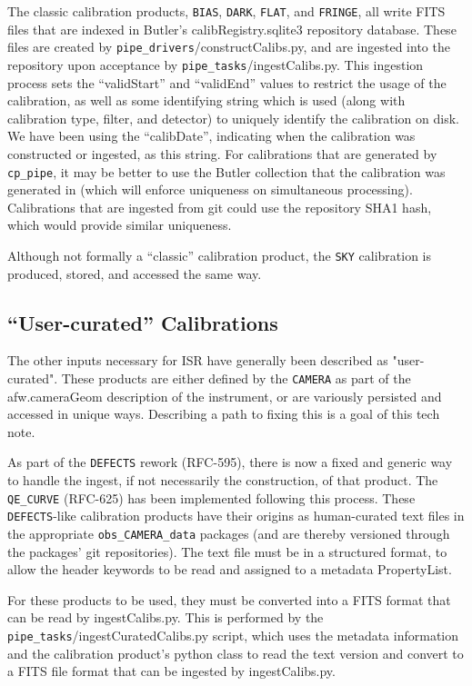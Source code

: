 \documentclass[DM,authoryear,toc]{lsstdoc}
\begin{document}
The classic calibration products, \verb|BIAS|, \verb|DARK|,
\verb|FLAT|, and \verb|FRINGE|, all write FITS files that are indexed
in Butler's calibRegistry.sqlite3 repository database.  These files
are created by \verb|pipe_drivers|/constructCalibs.py, and are
ingested into the repository upon acceptance by
\verb|pipe_tasks|/ingestCalibs.py.  This ingestion process sets the
``validStart'' and ``validEnd'' values to restrict the usage of the
calibration, as well as some identifying string which is used (along
with calibration type, filter, and detector) to uniquely identify the
calibration on disk.  We have been using the ``calibDate'', indicating
when the calibration was constructed or ingested, as this string.  For
calibrations that are generated by \verb|cp_pipe|, it may be better to
use the Butler collection that the calibration was generated in (which
will enforce uniqueness on simultaneous processing).  Calibrations
that are ingested from git could use the repository SHA1 hash, which
would provide similar uniqueness.

Although not formally a ``classic'' calibration product, the \verb|SKY|
calibration is produced, stored, and accessed the same way.

\subsection{``User-curated'' Calibrations}

The other inputs necessary for ISR have generally been described as
"user-curated".  These products are either defined by the \verb|CAMERA| as
part of the afw.cameraGeom description of the instrument, or are
variously persisted and accessed in unique ways.  Describing a path to
fixing this is a goal of this tech note.

As part of the \verb|DEFECTS| rework (RFC-595), there is now a fixed and
generic way to handle the ingest, if not necessarily the construction,
of that product.  The \verb|QE_CURVE| (RFC-625) has been implemented
following this process.  These \verb|DEFECTS|-like calibration products have
their origins as human-curated text files in the appropriate
\verb|obs_CAMERA_data| packages (and are thereby versioned through the
packages' git repositories).  The text file must be in a structured
format, to allow the header keywords to be read and assigned to a
metadata PropertyList.

For these products to be used, they must be converted into a FITS
format that can be read by ingestCalibs.py.  This is performed by the
\verb|pipe_tasks|/ingestCuratedCalibs.py script, which uses the metadata
information and the calibration product's python class to read the
text version and convert to a FITS file format that can be ingested by
ingestCalibs.py.
\end{document}

